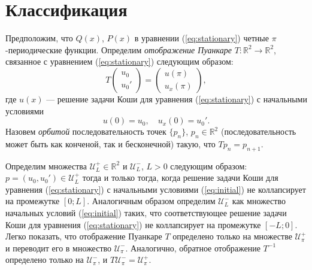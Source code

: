 \chapter{Классификация}

Предположим, что $Q(x)$, $P(x)$ в уравнении (\ref{eq:stationary}) четные $\pi$-периодические функции.
Определим {\it отображение Пуанкаре} $T: \mathbb{R}^2 \to \mathbb{R}^2$, связанное с уравнением (\ref{eq:stationary}) следующим образом:
%
\begin{equation}
T
\begin{pmatrix}
u_0 \\
u_0'
\end{pmatrix}
=
\begin{pmatrix}
u(\pi) \\
u_x(\pi)
\end{pmatrix},
\end{equation}
%
где $u(x)$ --- решение задачи Коши для уравнения (\ref{eq:stationary}) с начальными условиями
%
\begin{equation}
u(0) = u_0, \quad u_x(0) = u_0'.
\label{eq:initial}
\end{equation}
%
Назовем {\it орбитой} последовательность точек $\{ p_n \}$, $p_n \in \mathbb{R}^2$ (последовательность может быть как конченой, так и бесконечной) такую, что $Tp_n = p_{n+1}$.

Определим множества $\mathcal{U}_L^+ \in \mathbb{R}^2$ и $\mathcal{U}_L^-$, $L > 0$ следующим образом: $p = (u_0, u_0') \in \mathcal{U}_L^+$ тогда и только тогда, когда решение задачи Коши для уравнения (\ref{eq:stationary}) с начальными условиями (\ref{eq:initial}) не коллапсирует на промежутке $[0;L]$.
Аналогичным образом определим $\mathcal{U}_L^-$ как множество начальных условий (\ref{eq:initial}) таких, что соответствующее решение задачи Коши для уравнения (\ref{eq:stationary}) не коллапсирует на промежутке $[-L;0]$.
Легко показать, что отображение Пуанкаре $T$ определено только на множестве $\mathcal{U}_{\pi}^+$ и переводит его в множество $\mathcal{U}_{\pi}^-$.
Аналогично, обратное отображение $T^{-1}$ определено только на $\mathcal{U}_{\pi}^-$, и $T \mathcal{U}_{\pi}^- = \mathcal{U}_{\pi}^+$.

